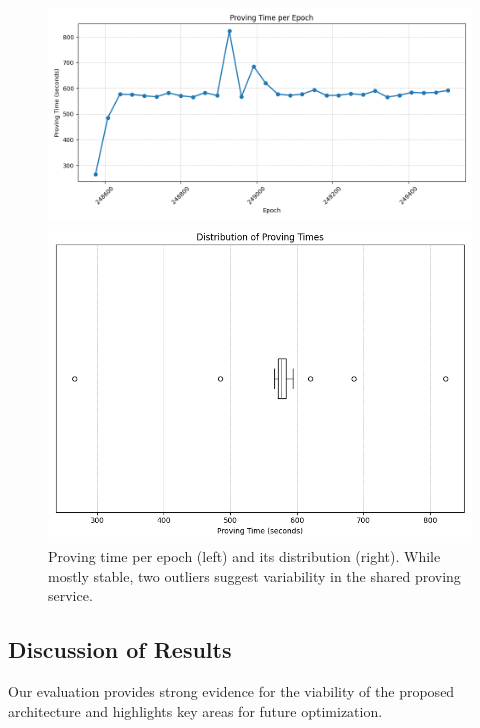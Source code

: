 \documentclass[runningheads]{llncs}
\begin{document}
\begin{figure}[H]
    \centering
    \begin{minipage}{0.48\textwidth}
        \centering
        \includegraphics[width=\textwidth]{diagrams/proving_time_vs_epoch.png}
    \end{minipage}\hfill
    \begin{minipage}{0.48\textwidth}
        \centering
        \includegraphics[width=\textwidth]{diagrams/proving_time_distribution.png}
    \end{minipage}
    \caption{Proving time per epoch (left) and its distribution (right). While mostly stable, two outliers suggest variability in the shared proving service.}
    \label{fig:proving_time}
\end{figure}

\subsection{Discussion of Results}
\label{subsection:discussion-of-results}
Our evaluation provides strong evidence for the viability of the proposed architecture and highlights key areas for future optimization.
\end{document}
